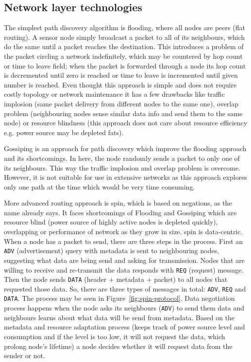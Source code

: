 \subsection{Network layer technologies}
The simplest path discovery algorithm is flooding, where all nodes are peers (flat routing). A sensor node simply broadcast a packet to all of its neighbours, which do the same until a packet reaches the destination. This introduces a problem of the packet circling a network indefinitely, which may be countered by hop count or time to leave field; when the packet is forwarded through a node its hop count is decremented until zero is reached or time to leave is incremented until given number is reached. Even thought this approach is simple and does not require costly topology or network maintenance it has a few drawbacks like traffic implosion (same packet delivery from different nodes to the same one), overlap problem (neighbouring nodes sense similar data info and send them to the same node) or resource blindness (this approach does not care about resource efficiency e.g. power source may be depleted fats).

Gossiping is an approach for path discovery which improve the flooding approach and its shortcomings. In here, the node randomly sends a packet to only one of its neighbours. This way the traffic implosion and overlap problem is overcome. However, it is not suitable for use in extensive networks as this approach explores only one path at the time which would be very time consuming. 

More advanced routing approach is \acrfull{spin}, which is based on negations, as the name already says. It faces shortcomings of Flooding and Gossiping which are resource blind (power source of highly active nodes is depleted quickly), overlapping or performance of network as they grow in size. \acrshort{spin} is data-centric. When a node has a packet to send, there are three steps in the process. First an \texttt{ADV} (advertisement) query with metadata is sent to neighbouring nodes, suggesting what data are being send and asking for transmission. Nodes that are willing to receive and re-transmit the data responds with \texttt{REQ} (request) message. Then the node sends \texttt{DATA} (header + metadata + packet) to all nodes that requested those data. So, there are three types of messages in total: \texttt{ADV}, \texttt{REQ} and \texttt{DATA}. The process may be seen in Figure~\ref{fig:spin-protocol}. Data negotiation process happens when the node asks its neighbours (\texttt{ADV}) to send them data and neighbours learns about what data will be send from metadata. Based on the metadata and resource adaptation process (keeps track of power source level and consumption and if the level is too low, it will not request the data, which prolong node’s lifetime) a node decides whether it will request data from the sender or not.

